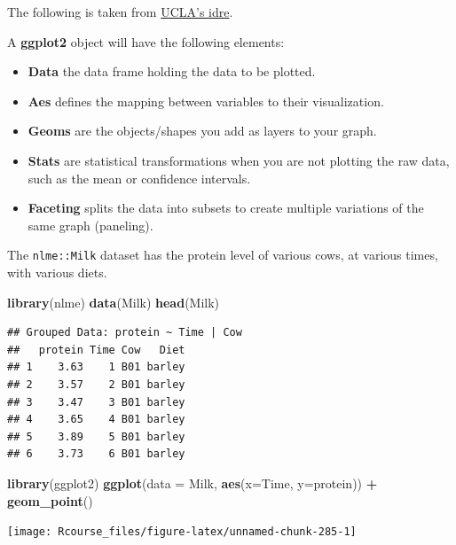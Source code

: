 \documentclass[]{book}
\newenvironment{Shaded}{\begin{snugshade}}{\end{snugshade}}
\newcommand{\KeywordTok}[1]{\textcolor[rgb]{0.13,0.29,0.53}{\textbf{#1}}}
\newcommand{\DataTypeTok}[1]{\textcolor[rgb]{0.13,0.29,0.53}{#1}}
\newcommand{\StringTok}[1]{\textcolor[rgb]{0.31,0.60,0.02}{#1}}
\newcommand{\OperatorTok}[1]{\textcolor[rgb]{0.81,0.36,0.00}{\textbf{#1}}}
\newcommand{\NormalTok}[1]{#1}
\providecommand{\tightlist}{%
  \setlength{\itemsep}{0pt}\setlength{\parskip}{0pt}}
\theoremstyle{definition}
\theoremstyle{definition}
\theoremstyle{definition}
\theoremstyle{remark}
\begin{document}
The following is taken from
\href{http://www.ats.ucla.edu/stat/r/seminars/ggplot2_intro/ggplot2_intro.htm}{UCLA's
idre}.

A \textbf{ggplot2} object will have the following elements:

\begin{itemize}
\tightlist
\item
  \textbf{Data} the data frame holding the data to be plotted.
\item
  \textbf{Aes} defines the mapping between variables to their
  visualization.
\item
  \textbf{Geoms} are the objects/shapes you add as layers to your graph.
\item
  \textbf{Stats} are statistical transformations when you are not
  plotting the raw data, such as the mean or confidence intervals.
\item
  \textbf{Faceting} splits the data into subsets to create multiple
  variations of the same graph (paneling).
\end{itemize}

The \texttt{nlme::Milk} dataset has the protein level of various cows,
at various times, with various diets.

\begin{Shaded}
\begin{Highlighting}[]
\KeywordTok{library}\NormalTok{(nlme)}
\KeywordTok{data}\NormalTok{(Milk)}
\KeywordTok{head}\NormalTok{(Milk)}
\end{Highlighting}
\end{Shaded}

\begin{verbatim}
## Grouped Data: protein ~ Time | Cow
##   protein Time Cow   Diet
## 1    3.63    1 B01 barley
## 2    3.57    2 B01 barley
## 3    3.47    3 B01 barley
## 4    3.65    4 B01 barley
## 5    3.89    5 B01 barley
## 6    3.73    6 B01 barley
\end{verbatim}

\begin{Shaded}
\begin{Highlighting}[]
\KeywordTok{library}\NormalTok{(ggplot2)}
\KeywordTok{ggplot}\NormalTok{(}\DataTypeTok{data =}\NormalTok{ Milk, }\KeywordTok{aes}\NormalTok{(}\DataTypeTok{x=}\NormalTok{Time, }\DataTypeTok{y=}\NormalTok{protein)) }\OperatorTok{+}
\StringTok{  }\KeywordTok{geom_point}\NormalTok{()}
\end{Highlighting}
\end{Shaded}

\texttt{[image: Rcourse\_files/figure-latex/unnamed-chunk-285-1]}
\end{document}
